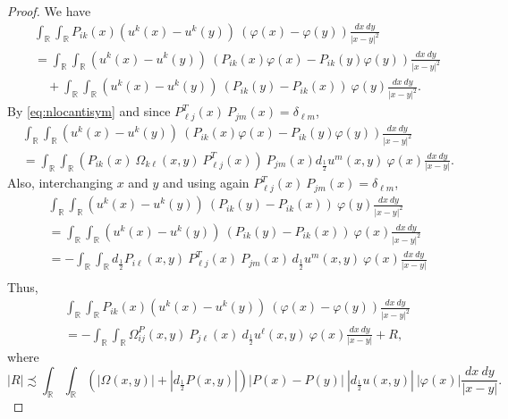 \documentclass[12pt]{amsart}
\theoremstyle{definition}
\newcommand{\R}{\mathbb{R}}
\newcommand{\brac}[1]{\left (#1 \right )}
\numberwithin{theorem}{section} \numberwithin{equation}{section}
\newcommand{\aleq}{\precsim}
\begin{document}
\begin{proof}
We have
\[
\begin{split}
 &\int_{\R}\int_{\R} P_{ik}(x) \brac{u^k(x)-u^k(y)}\ \brac{\varphi(x) - \varphi(y)} \frac{dx\ dy}{|x-y|^{2}}\\
 &=\int_{\R}\int_{\R} \brac{u^k(x)-u^k(y)}\ \brac{P_{ik}(x) \varphi(x) - P_{ik}(y) \varphi(y)} \frac{dx\ dy}{|x-y|^{2}}\\
 &\quad+\int_{\R}\int_{\R} \brac{u^k(x)-u^k(y)}\ \brac{P_{ik}(y)  - P_{ik}(x)}\ \varphi(y) \frac{dx\ dy}{|x-y|^{2}}.
 \end{split}
 \]
By \eqref{eq:nlocantisym} and since $P^T_{\ell j}(x)\ P_{jm}(x) = \delta_{\ell m}$,
\[
\begin{split}
 &\int_{\R}\int_{\R} \brac{u^k(x)-u^k(y)}\ \brac{P_{ik}(x) \varphi(x) - P_{ik}(y) \varphi(y)} \frac{dx\ dy}{|x-y|^{2}}\\
 &=\int_{\R}\int_{\R} \brac{P_{ik}(x)\ \Omega_{k\ell}(x,y)\ P^T_{\ell j}(x)}\ P_{j{m}}(x) d_{\frac{1}{2}}u^{m}(x,y)\ \varphi(x)\frac{dx\ dy}{|x-y|}.
\end{split}
 \]
Also, interchanging $x$ and $y$ and using again $P^T_{\ell j}(x)\ P_{jm}(x) = \delta_{\ell m}$,
\[
\begin{split}
  &\int_{\R}\int_{\R} \brac{u^k(x)-u^k(y)}\ \brac{P_{ik}(y)  - P_{ik}(x)}\ \varphi(y) \frac{dx\ dy}{|x-y|^{2}}\\
  &=\int_{\R}\int_{\R} \brac{u^k(x)-u^k(y)}\ \brac{P_{ik}(y)  - P_{ik}(x)}\ \varphi(x) \frac{dx\ dy}{|x-y|^{2}}\\
  &=-\int_{\R}\int_{\R} d_{\frac{1}{2}}P_{i\ell}(x,y)\ P_{\ell j}^{{T}}(x)\ P_{j{m}}(x)\, d_{\frac{1}{2}}u^{m}(x,y)\ \varphi(x)\frac{dx\ dy}{|x-y|}\\
\end{split}
\]
Thus,
 \[
 \begin{split}
 &\int_{\R}\int_{\R} P_{ik}(x) \brac{u^k(x)-u^k(y)}\ \brac{\varphi(x) - \varphi(y)} \frac{dx\ dy}{|x-y|^{2}}\\
 &={-}\int_{\R}\int_{\R} \Omega_{ij}^P(x,y)\ P_{j\ell}(x)\ d_{\frac{1}{2}}u^\ell(x,y)\ \varphi(x) \frac{dx\ dy}{|x-y|} +R,
\end{split}
 \]
where
\[
 |R| \aleq \int_{\R}\int_{\R} \brac{|\Omega(x,y)| + |d_{\frac{1}{2}} P(x,y)|} |P(x)-P(y)|\ |d_{\frac{1}{2}}u(x,y)|\ |\varphi(x)| \frac{dx\ dy}{|x-y|}.
\]
\end{proof}
\end{document}
